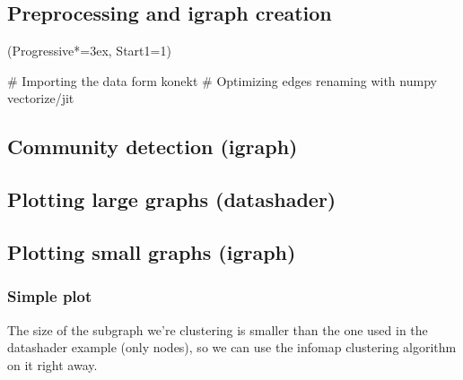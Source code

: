 \documentclass[12pt, a4paper]{article}
\let\OldEasylist\easylist
\let\OldEndEasylist\endeasylist
\renewenvironment{easylist}{%
    \OldEasylist%
    \ListProperties(Progressive*=3ex, Start1=1)%
}{%
    \OldEndEasylist%
}%
\begin{document}
\subsection{Preprocessing and igraph creation}
\begin{easylist}
# Importing the data form konekt
# Optimizing edges renaming with numpy vectorize/jit
\end{easylist}

\subsection{Community detection (igraph)}

\subsection{Plotting large graphs (datashader)}


\subsection{Plotting small graphs (igraph)}
\subsubsection{Simple plot}

The size of the subgraph we're clustering is smaller than the one used in the datashader example (only  nodes), so we can use the infomap clustering algorithm on it right away.
\end{document}
